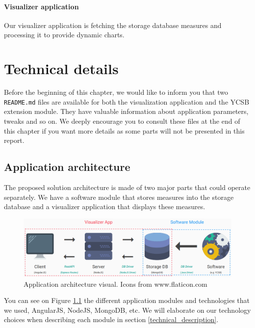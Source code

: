 \documentclass[a4paper,11pt]{report}
\begin{document}
\subsubsection{Visualizer application}

Our visualizer application is fetching the storage database measures and processing it to provide dynamic charts.

\clearpage

\chapter{Technical details}\label{techical_chapter}

Before the beginning of this chapter, we would like to inform you that two \texttt{README.md} files are available for both the visualization application and the YCSB extension module. They have valuable information about application parameters, tweaks and so on. We deeply encourage you to consult these files at the end of this chapter if you want more details as some parts will not be presented in this report.

\section{Application architecture}\label{app_archi_section}

The proposed solution architecture is made of two major parts that could operate separately. We have a software module that stores measures into the storage database and a visualizer application that displays these measures.

\begin{figure}[ht]
\begin{center}
\includegraphics[width=1\linewidth]{images/archi_small_complete.png}
\caption{Application architecture visual. Icons from www.flaticon.com}
\label{app_archi_fig}
\end{center}
\end{figure}

You can see on Figure \ref{app_archi_fig} the different application modules and technologies that we used, AngularJS, NodeJS, MongoDB, etc. We will elaborate on our technology choices when describing each module in section \ref{technical_description}. 
\end{document}
